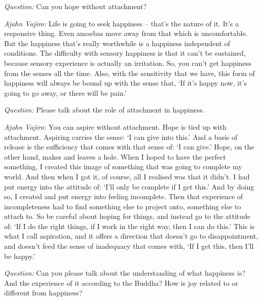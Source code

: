\bigskip

\emph{Question:} Can you hope without attachment?

\emph{Ajahn Vajiro:} Life is going to seek happiness -- that's the nature of it. It's a
responsive thing. Even amoebas move away from that which is uncomfortable. But
the happiness that's really worthwhile is a happiness independent of conditions.
The difficulty with sensory happiness is that it can't be sustained, because
sensory experience is actually an irritation. So, you can't get happiness from
the senses all the time. Also, with the sensitivity that we have, this form of
happiness will always be bound up with the sense that, `If it's happy now, it's
going to go away, or there will be pain.'

\clearpage

\enlargethispage{2\baselineskip}

\emph{Question:} Please talk about the role of attachment in happiness.

\emph{Ajahn Vajiro:} You can aspire without attachment. Hope is tied up with
attachment. Aspiring carries the sense: `I can give into this.' And a basis of
release is the sufficiency that comes with that sense of: `I can give.' Hope, on
the other hand, makes and leaves a hole. When I hoped to have the perfect
something, I created this image of something that was going to complete my
world. And then when I got it, of course, all I realised was that it didn't. I
had put energy into the attitude of: `I'll only be complete if I get this.' And
by doing so, I created and put energy into feeling incomplete. Then that
experience of incompleteness had to find something else to project onto,
something else to attach to. So be careful about hoping for things, and instead
go to the attitude of: `If I do the right things, if I work in the right way,
then I can do this.' This is what I call aspiration, and it offers a direction
that doesn't go to disappointment, and doesn't feed the sense of inadequacy that
comes with, `If I get this, then I'll be happy.'

\bigskip

\emph{Question:} Can you please talk about the understanding of what happiness is? And
the experience of it according to the Buddha? How is joy related to or different
from happiness?

\enlargethispage{2\baselineskip}

